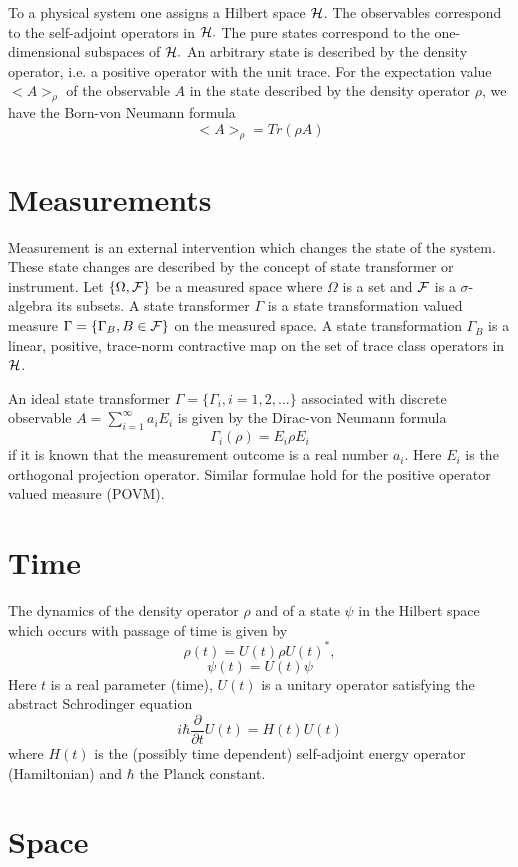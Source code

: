 \documentclass[12pt]{article}
\begin{document}
To a physical system one assigns a Hilbert space ${\cal H}$. The
observables correspond  to the self-adjoint operators in ${\cal
H}.$ The pure states correspond  to the one-dimensional subspaces
of ${\cal H}.$ An arbitrary state is described by the density
operator, i.e. a positive operator with the unit trace. For the
expectation value $<A>_{\rho}$ of the observable $A$ in the state
described by the density operator $\rho$, we have the Born-von
Neumann formula
$$
<A>_{\rho}=Tr (\rho A)
$$

\section{Measurements}

Measurement is an external intervention which changes the state of
the system. These state changes are described by the concept of
state transformer or instrument. Let $\{\Omega,{\cal F}\}$ be a
measured space where $\Omega$ is a set and ${\cal F}$ is a
$\sigma$-algebra its subsets. A state transformer $\Gamma$ is a
state transformation valued measure $\Gamma =\{\Gamma_B, B\in
{\cal F} \}$ on the measured space. A state transformation
$\Gamma_B$ is a linear, positive, trace-norm contractive map on
the set of trace class operators in ${\cal H}$.

An ideal state transformer $\Gamma =\{\Gamma_i, i=1,2,... \}$
associated with discrete observable $A=\sum_{i=1}^{\infty} a_iE_i$
is given by the Dirac-von Neumann formula
$$
\Gamma_i(\rho)= E_i\rho E_i
$$
if it is known that the measurement outcome is a real number
$a_i.$ Here $E_i$ is the orthogonal projection operator. Similar
formulae hold for the positive operator valued  measure (POVM).

\section{Time}

The dynamics of the density operator $\rho$ and of a state $\psi$
in the Hilbert space which occurs with passage of time is given by
$$
\rho(t)=U(t)\rho U(t)^*,
$$
$$
\psi (t)=U(t)\psi
$$
Here $t$ is a real  parameter (time), $U(t)$ is a unitary operator
satisfying the abstract Schrodinger equation
$$
i\hbar \frac{\partial}{\partial t}U(t)=H(t)U(t)
$$
where $H(t)$ is the (possibly time dependent) self-adjoint energy
operator (Hamiltonian) and $\hbar$ the Planck constant.

\section{Space}
\end{document}
